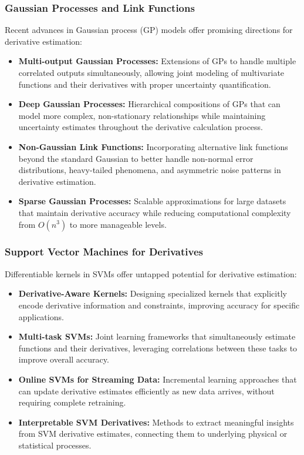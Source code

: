 \documentclass{article}
\begin{document}
\subsubsection{Gaussian Processes and Link Functions}

Recent advances in Gaussian process (GP) models offer promising directions for derivative estimation:

\begin{itemize}
    \item \textbf{Multi-output Gaussian Processes:} Extensions of GPs to handle multiple correlated outputs simultaneously, allowing joint modeling of multivariate functions and their derivatives with proper uncertainty quantification.
    
    \item \textbf{Deep Gaussian Processes:} Hierarchical compositions of GPs that can model more complex, non-stationary relationships while maintaining uncertainty estimates throughout the derivative calculation process.
    
    \item \textbf{Non-Gaussian Link Functions:} Incorporating alternative link functions beyond the standard Gaussian to better handle non-normal error distributions, heavy-tailed phenomena, and asymmetric noise patterns in derivative estimation.
    
    \item \textbf{Sparse Gaussian Processes:} Scalable approximations for large datasets that maintain derivative accuracy while reducing computational complexity from $O(n^3)$ to more manageable levels.
\end{itemize}

\subsubsection{Support Vector Machines for Derivatives}

Differentiable kernels in SVMs offer untapped potential for derivative estimation:

\begin{itemize}
    \item \textbf{Derivative-Aware Kernels:} Designing specialized kernels that explicitly encode derivative information and constraints, improving accuracy for specific applications.
    
    \item \textbf{Multi-task SVMs:} Joint learning frameworks that simultaneously estimate functions and their derivatives, leveraging correlations between these tasks to improve overall accuracy.
    
    \item \textbf{Online SVMs for Streaming Data:} Incremental learning approaches that can update derivative estimates efficiently as new data arrives, without requiring complete retraining.
    
    \item \textbf{Interpretable SVM Derivatives:} Methods to extract meaningful insights from SVM derivative estimates, connecting them to underlying physical or statistical processes.
\end{itemize}
\end{document}
